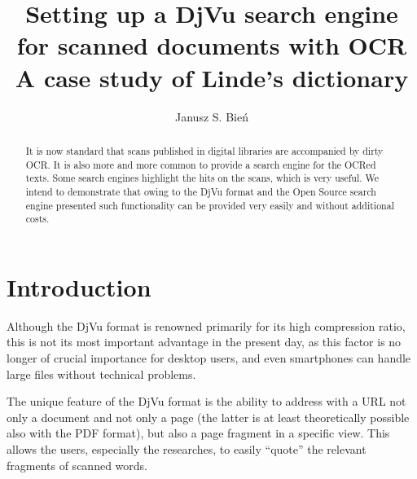 \documentclass{article}
\newcommand{\keywords}[1]{\par\addvspace\baselineskip
\noindent\keywordname\enspace\ignorespaces#1}
\begin{document}
\title{Setting up a DjVu search engine\\ for scanned documents with OCR\\A case study of Linde's dictionary}



%
%
\author{Janusz S. Bień}
%
%
%

\maketitle


\begin{abstract}
  It is now standard that scans published in digital libraries are
  accompanied by dirty OCR.  It is also more and more common to
  provide a search engine for the OCRed texts. Some search engines
  highlight the hits on the scans, which is very useful. We intend to
  demonstrate that owing to the DjVu format and the Open Source
  search engine presented such functionality can be provided very
  easily and without additional costs.  
\end{abstract}


\section{Introduction}

Although the DjVu format is renowned primarily for its high
compression ratio, this is not its most important advantage in the
present day, as this factor is no longer of crucial importance for
desktop users, and even smartphones can handle large files without
technical problems.

The unique feature of the DjVu format is the ability to address with
a URL not only a document and not only a page (the latter is at least
theoretically possible also with the PDF format), but also a page
fragment in a specific view. This allows the users, especially the
researches, to easily “quote” the relevant fragments of scanned
words. 
\end{document}
